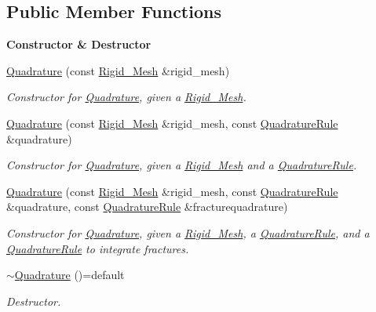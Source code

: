 \subsection*{Public Member Functions}
\begin{Indent}{\bf Constructor \& Destructor}\par
\begin{DoxyCompactItemize}
\item 
\hyperlink{classFVCode3D_1_1Quadrature_aefb925716304b6546c5aeba01fab383a}{Quadrature} (const \hyperlink{classFVCode3D_1_1Rigid__Mesh}{Rigid\+\_\+\+Mesh} \&rigid\+\_\+mesh)
\begin{DoxyCompactList}\small\item\em Constructor for \hyperlink{classFVCode3D_1_1Quadrature}{Quadrature}, given a \hyperlink{classFVCode3D_1_1Rigid__Mesh}{Rigid\+\_\+\+Mesh}. \end{DoxyCompactList}\item 
\hyperlink{classFVCode3D_1_1Quadrature_a9187a5705b15af6384771bc2e153b175}{Quadrature} (const \hyperlink{classFVCode3D_1_1Rigid__Mesh}{Rigid\+\_\+\+Mesh} \&rigid\+\_\+mesh, const \hyperlink{classFVCode3D_1_1QuadratureRule}{Quadrature\+Rule} \&quadrature)
\begin{DoxyCompactList}\small\item\em Constructor for \hyperlink{classFVCode3D_1_1Quadrature}{Quadrature}, given a \hyperlink{classFVCode3D_1_1Rigid__Mesh}{Rigid\+\_\+\+Mesh} and a \hyperlink{classFVCode3D_1_1QuadratureRule}{Quadrature\+Rule}. \end{DoxyCompactList}\item 
\hyperlink{classFVCode3D_1_1Quadrature_a5f61238ba1001ac521cae0ec308b601f}{Quadrature} (const \hyperlink{classFVCode3D_1_1Rigid__Mesh}{Rigid\+\_\+\+Mesh} \&rigid\+\_\+mesh, const \hyperlink{classFVCode3D_1_1QuadratureRule}{Quadrature\+Rule} \&quadrature, const \hyperlink{classFVCode3D_1_1QuadratureRule}{Quadrature\+Rule} \&fracturequadrature)
\begin{DoxyCompactList}\small\item\em Constructor for \hyperlink{classFVCode3D_1_1Quadrature}{Quadrature}, given a \hyperlink{classFVCode3D_1_1Rigid__Mesh}{Rigid\+\_\+\+Mesh}, a \hyperlink{classFVCode3D_1_1QuadratureRule}{Quadrature\+Rule}, and a \hyperlink{classFVCode3D_1_1QuadratureRule}{Quadrature\+Rule} to integrate fractures. \end{DoxyCompactList}\item 
\hyperlink{classFVCode3D_1_1Quadrature_a1446f64b8ea79e20e42d68ef69849d1f}{$\sim$\+Quadrature} ()=default
\begin{DoxyCompactList}\small\item\em Destructor. \end{DoxyCompactList}\end{DoxyCompactItemize}
\end{Indent}

